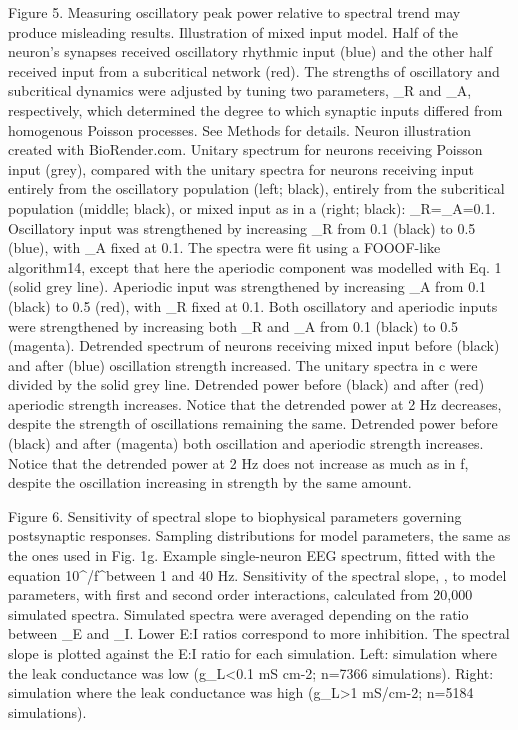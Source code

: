 Figure 5. Measuring oscillatory peak power relative to spectral trend may produce misleading results.
	Illustration of mixed input model. Half of the neuron’s synapses received oscillatory rhythmic input (blue) and the other half received input from a subcritical network (red). The strengths of oscillatory and subcritical dynamics were adjusted by tuning two parameters, \alpha_R and \alpha_A, respectively, which determined the degree to which synaptic inputs differed from homogenous Poisson processes. See Methods for details. Neuron illustration created with BioRender.com.
	Unitary spectrum for neurons receiving Poisson input (grey), compared with the unitary spectra for neurons receiving input entirely from the oscillatory population (left; black), entirely from the subcritical population (middle; black), or mixed input as in a (right; black): \alpha_R=\alpha_A=0.1.
	Oscillatory input was strengthened by increasing \alpha_R from 0.1 (black) to 0.5 (blue), with \alpha_A fixed at 0.1. The spectra were fit using a FOOOF-like algorithm14, except that here the aperiodic component was modelled with Eq. 1 (solid grey line).
	Aperiodic input was strengthened by increasing \alpha_A from 0.1 (black) to 0.5 (red), with \alpha_R fixed at 0.1.
	Both oscillatory and aperiodic inputs were strengthened by increasing both \alpha_R and \alpha_A from 0.1 (black) to 0.5 (magenta).
	Detrended spectrum of neurons receiving mixed input before (black) and after (blue) oscillation strength increased. The unitary spectra in c were divided by the solid grey line. 
	Detrended power before (black) and after (red) aperiodic strength increases. Notice that the detrended power at 2 Hz decreases, despite the strength of oscillations remaining the same.
	Detrended power before (black) and after (magenta) both oscillation and aperiodic strength increases. Notice that the detrended power at 2 Hz does not increase as much as in f, despite the oscillation increasing in strength by the same amount.

Figure 6. Sensitivity of spectral slope to biophysical parameters governing postsynaptic responses.
	Sampling distributions for model parameters, the same as the ones used in Fig. 1g.
	Example single-neuron EEG spectrum, fitted with the equation {10}^\alpha/f^\beta between 1 and 40 Hz.
	Sensitivity of the spectral slope, \beta, to model parameters, with first and second order interactions, calculated from 20,000 simulated spectra.
	Simulated spectra were averaged depending on the ratio between \lambda_E and \lambda_I. Lower E:I ratios correspond to more inhibition.
	The spectral slope is plotted against the E:I ratio for each simulation. Left: simulation where the leak conductance was low (g_L<0.1 mS cm-2; n=7366 simulations). Right: simulation where the leak conductance was high (g_L>1 mS/cm-2; n=5184 simulations).

